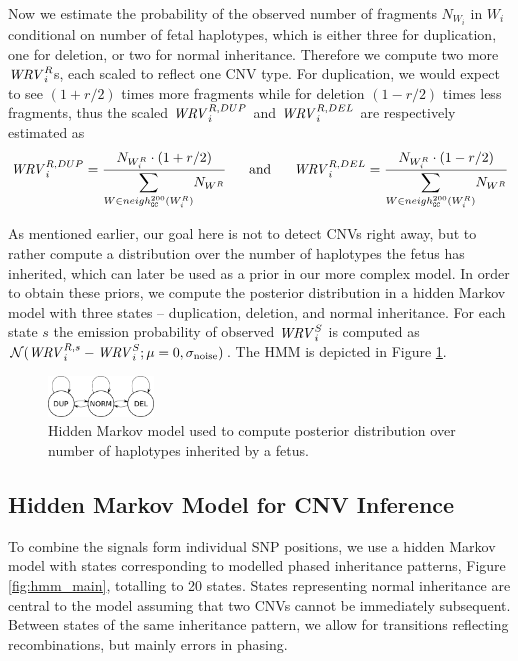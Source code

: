 Now we estimate the probability of the observed number of fragments $N_{W_i}$ in $W_i$ conditional on number of fetal haplotypes, which is either three for duplication, one for deletion, or two for normal inheritance. Therefore we compute two more $\mathit{WRV}_i^R$s, each scaled to reflect one CNV type. For duplication, we would expect to see $(1+r/2)$ times more fragments while for deletion $(1-r/2)$ times less fragments, thus the scaled $\mathit{WRV}_i^{R,DUP}$ and $\mathit{WRV}_i^{R,DEL}$ are respectively estimated as
\begin{align}
\WRV_i^{R,DUP} = \frac{ N_{W_i^R} \cdot (1+r/2) }{ \mathlarger{\sum_{W \in neigh_{\G\C}^{200}(W_i^R)}} N_{W^R} }
\text{ ~~~~and~~~~ }
\WRV_i^{R,DEL} = \frac{ N_{W_i^R} \cdot (1-r/2) }{ \mathlarger{\sum_{W \in neigh_{\G\C}^{200}(W_i^R)}} N_{W^R} }
\end{align}

As mentioned earlier, our goal here is not to detect CNVs right away, but to rather compute a distribution over the number of haplotypes the fetus has inherited, which can later be used as a prior in our more complex model. In order to obtain these priors, we compute the posterior distribution in a hidden Markov model with three states -- duplication, deletion, and normal inheritance. For each state $s$ the emission probability of observed $\mathit{WRV}_i^S$ is computed as $\mathcal{N}(\mathit{WRV}_i^{R,s}-\mathit{WRV}_i^S; \mu=0, \sigma_{\text{noise}})$. The HMM is depicted in Figure \ref{fig:hmm_coverage}.

\begin{figure}[h]
\center\includegraphics[width = 0.25\textwidth]{figures/cov-HMM}
\caption{Hidden Markov model used to compute posterior distribution over number of haplotypes inherited by a fetus.}\label{fig:hmm_coverage}
\end{figure}

\subsection{Hidden Markov Model for CNV Inference}\label{ss:hmm}
To combine the signals form individual SNP positions, we use a hidden Markov model with states corresponding to modelled phased inheritance patterns, Figure \ref{fig:hmm_main}, totalling to 20 states. States representing normal inheritance are central to the model assuming that two CNVs cannot be immediately subsequent. Between states of the same inheritance pattern, we allow for transitions reflecting recombinations, but mainly errors in phasing.

